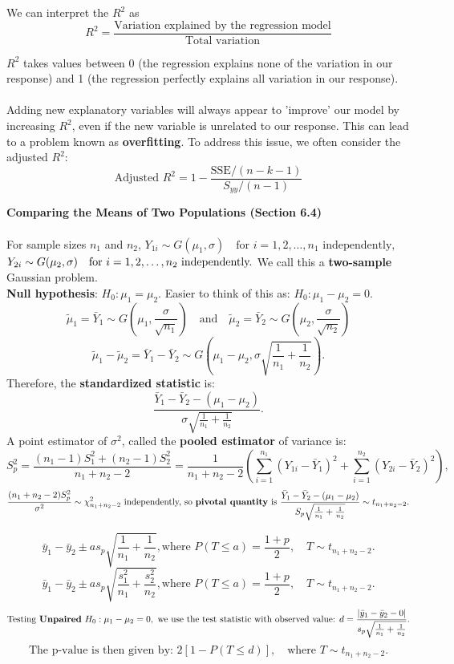 \documentclass[a4paper,12pt]{article}
\begin{document}
We can interpret the $R^2$ as
\[
R^2 = \frac{\text{Variation explained by the regression model}}{\text{Total variation}}
\]

$R^2$ takes values between 0 (the regression explains none of the variation in our response) and 1 (the regression perfectly explains all variation in our response).
\\
\\Adding new explanatory variables will always appear to 'improve' our model by increasing $R^2$, even if the new variable is unrelated to our response. 
This can lead to a problem known as \textbf{overfitting}. To address this issue, we often consider the adjusted $R^2$:
\[
\text{Adjusted } R^2 = 1 - \frac{\text{SSE} / (n - k - 1)}{S_{yy} / (n - 1)}
\]


\bigskip
\textbf{Comparing the Means of Two Populations (Section 6.4)}
\\
\\For sample sizes \(n_1\) and \(n_2\), 
$Y_{1i} \sim G(\mu_1, \sigma) \quad \text{for } i = 1, 2, \dots, n_1 \text{ independently,} \quad$
$Y_{2i} \sim G(\mu_2, \sigma) 
\\\quad \text{for } i = 1, 2, \dots, n_2 \text{ independently.}$ We call this a \textbf{two-sample} Gaussian problem.
\\\textbf{Null hypothesis}: $
H_0 : \mu_1 = \mu_2.$
Easier to think of this as:
$H_0 : \mu_1 - \mu_2 = 0.$
\[
\tilde{\mu}_1 = \bar{Y}_1 \sim G\left(\mu_1, \frac{\sigma}{\sqrt{n_1}}\right)
\quad \text{and} \quad 
\tilde{\mu}_2 = \bar{Y}_2 \sim G\left(\mu_2, \frac{\sigma}{\sqrt{n_2}}\right)
\]
\[
\tilde{\mu}_1 - \tilde{\mu}_2 = \bar{Y}_1 - \bar{Y}_2 \sim G\left(\mu_1 - \mu_2, \sigma \sqrt{\frac{1}{n_1} + \frac{1}{n_2}}\right).
\]
Therefore, the \textbf{standardized statistic} is:
\[
\frac{\bar{Y}_1 - \bar{Y}_2 - (\mu_1 - \mu_2)}{\sigma \sqrt{\frac{1}{n_1} + \frac{1}{n_2}}}.
\]
A point estimator of \(\sigma^2\), called the \textbf{pooled estimator} of variance is:
\[
S_p^2 = \frac{(n_1 - 1)S_1^2 + (n_2 - 1)S_2^2}{n_1 + n_2 - 2}
= \frac{1}{n_1 + n_2 - 2} 
\left(
\sum_{i=1}^{n_1} (Y_{1i} - \bar{Y}_1)^2 +
\sum_{i=1}^{n_2} (Y_{2i} - \bar{Y}_2)^2
\right),
\]
\bigskip
\[
\frac{(n_1 + n_2 - 2)S_p^2}{\sigma^2} \sim \chi^2_{n_1 + n_2 - 2} \text{ independently, so \textbf{pivotal quantity} is }
\frac{\bar{Y}_1 - \bar{Y}_2 - (\mu_1 - \mu_2)}{S_p \sqrt{\frac{1}{n_1} + \frac{1}{n_2}}} \sim t_{n_1 + n_2 - 2}.
\]

\[\bar{y}_1 - \bar{y}_2 \pm a s_p \sqrt{\frac{1}{n_1} + \frac{1}{n_2}}, \text{where } P(T \leq a) = \frac{1 + p}{2}, \quad T \sim t_{n_1 + n_2 - 2}.
\]
\[\bar{y}_1 - \bar{y}_2 \pm a s_p \sqrt{\frac{s^2_1}{n_1} + \frac{s^2_2}{n_2}}, \text{where } P(T \leq a) = \frac{1 + p}{2}, \quad T \sim t_{n_1 + n_2 - 2}.
\]
\[
\text{Testing \textbf{Unpaired} } H_0 : \mu_1 - \mu_2 = 0, \text{ we use the test statistic with observed value: }
d = \frac{\lvert \bar{y}_1 - \bar{y}_2 - 0 \rvert}{s_p \sqrt{\frac{1}{n_1} + \frac{1}{n_2}}}.
\]
\[
\text{The p-value is then given by: }
2 \left[ 1 - P(T \leq d) \right], \quad \text{where } T \sim t_{n_1 + n_2 - 2}.
\]
\end{document}
